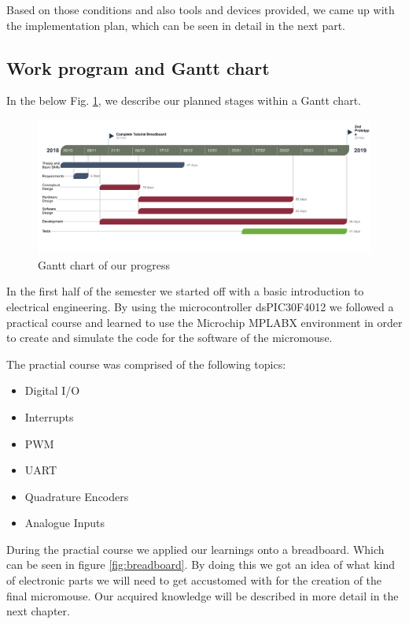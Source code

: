Based on those conditions and also tools and devices provided, we came up with the implementation plan, which can be seen in detail in the next part.

\subsection{Work program and Gantt chart}
In the below Fig. \ref{fig:gantt}, we describe our planned stages within a Gantt chart.

\begin{figure}[H]
    \centering
    \includegraphics[width=1\textwidth]{figures/micromouse-gantt.png}
    \caption{Gantt chart of our progress}
    \label{fig:gantt}
\end{figure}

\noindent
In the first half of the semester we started off with a basic introduction to electrical engineering. By using the microcontroller dsPIC30F4012 we followed a practical course and learned to use the Microchip MPLABX environment in order to create and simulate the code for the software of the micromouse.

\noindent
The practial course was comprised of the following topics:
\begin{itemize}
    \item Digital I/O
    \item Interrupts
    \item PWM
    \item UART
    \item Quadrature Encoders
    \item Analogue Inputs
\end{itemize}

\noindent
During the practial course we applied our learnings onto a breadboard. Which can be seen in figure \ref{fig:breadboard}. By doing this we got an idea of what kind of electronic parts we will need to get accustomed with for the creation of the final micromouse. Our acquired knowledge will be described in more detail in the next chapter.

